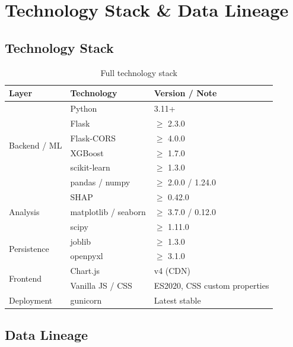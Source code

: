 \documentclass[11pt,a4paper]{article}
\begin{document}
\section{Technology Stack \& Data Lineage}

\subsection{Technology Stack}

\begin{table}[H]
\centering
\small
\begin{tabular}{lll}
\toprule
\textbf{Layer} & \textbf{Technology} & \textbf{Version / Note} \\
\midrule
\multirow{6}{*}{Backend / ML} 
  & Python           & 3.11+ \\
  & Flask            & $\geq$ 2.3.0 \\
  & Flask-CORS       & $\geq$ 4.0.0 \\
  & XGBoost          & $\geq$ 1.7.0 \\
  & scikit-learn     & $\geq$ 1.3.0 \\
  & pandas / numpy   & $\geq$ 2.0.0 / 1.24.0 \\
\midrule
\multirow{3}{*}{Analysis}
  & SHAP             & $\geq$ 0.42.0 \\
  & matplotlib / seaborn & $\geq$ 3.7.0 / 0.12.0 \\
  & scipy            & $\geq$ 1.11.0 \\
\midrule
\multirow{2}{*}{Persistence}
  & joblib           & $\geq$ 1.3.0 \\
  & openpyxl         & $\geq$ 3.1.0 \\
\midrule
\multirow{2}{*}{Frontend}
  & Chart.js         & v4 (CDN) \\
  & Vanilla JS / CSS & ES2020, CSS custom properties \\
\midrule
Deployment & gunicorn & Latest stable \\
\bottomrule
\end{tabular}
\caption{Full technology stack}
\end{table}

\subsection{Data Lineage}
\end{document}
